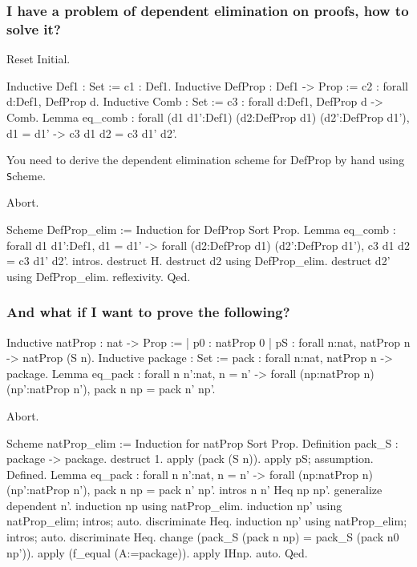 \documentclass[a4paper,pdftex]{article}
\def\Question#1{\stepcounter{question}\subsubsection{#1}}
\newcommand{\coqtt}[1]{{\tt #1}}
\begin{document}
\Question{I have a problem of dependent elimination on
proofs, how to solve it?}

\begin{coq_eval}
Reset Initial.
\end{coq_eval}

\begin{coq_example*}
Inductive Def1 : Set := c1 : Def1.
Inductive DefProp : Def1 -> Prop :=
  c2 : forall d:Def1, DefProp d.
Inductive Comb : Set :=
  c3 : forall d:Def1, DefProp d -> Comb.
Lemma eq_comb :
  forall (d1 d1':Def1) (d2:DefProp d1) (d2':DefProp d1'),
    d1 = d1' -> c3 d1 d2 = c3 d1' d2'.
\end{coq_example*}

 You need to derive the dependent elimination
scheme for DefProp by hand using {\coqtt Scheme}.

\begin{coq_eval}
Abort.
\end{coq_eval}

\begin{coq_example*}
Scheme DefProp_elim := Induction for DefProp Sort Prop.
Lemma eq_comb :
  forall d1 d1':Def1,
    d1 = d1' ->
    forall (d2:DefProp d1) (d2':DefProp d1'), c3 d1 d2 = c3 d1' d2'.
intros.
destruct H.
destruct d2 using DefProp_elim.
destruct d2' using DefProp_elim.
reflexivity.
Qed.
\end{coq_example*}


\Question{And what if I want to prove the following?}

\begin{coq_example*}
Inductive natProp : nat -> Prop :=
  | p0 : natProp 0
  | pS : forall n:nat, natProp n -> natProp (S n).
Inductive package : Set :=
  pack : forall n:nat, natProp n -> package.
Lemma eq_pack :
 forall n n':nat,
   n = n' ->
   forall (np:natProp n) (np':natProp n'), pack n np = pack n' np'.
\end{coq_example*}



\begin{coq_eval}
Abort.
\end{coq_eval}
\begin{coq_example*}
Scheme natProp_elim := Induction for natProp Sort Prop.
Definition pack_S : package -> package.
destruct 1.
apply (pack (S n)).
apply pS; assumption.
Defined.
Lemma eq_pack :
  forall n n':nat,
    n = n' ->
    forall (np:natProp n) (np':natProp n'), pack n np = pack n' np'.
intros n n' Heq np np'.
generalize dependent n'.
induction np using natProp_elim.
induction np' using natProp_elim; intros; auto.
 discriminate Heq.
induction np' using natProp_elim; intros; auto.
 discriminate Heq.
change (pack_S (pack n np) = pack_S (pack n0 np')).
apply (f_equal (A:=package)).
apply IHnp.
auto.
Qed.
\end{coq_example*}
\end{document}
